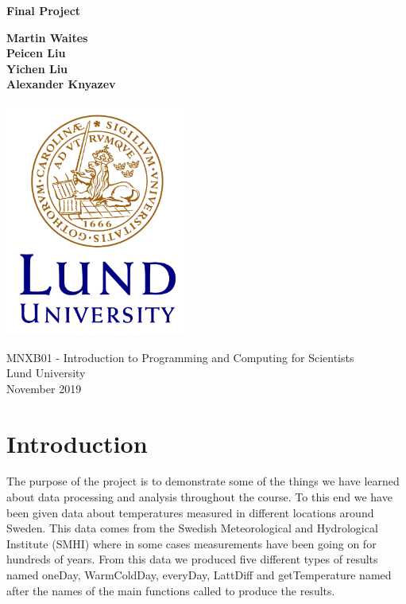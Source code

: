 \documentclass[a4paper,12pt]{article}
\begin{document}
\begin{titlepage}
    \begin{center}
        \vspace*{1cm}
        \Huge
        \textbf{Final Project}
        
        \Large
        \vspace{2.5cm}
        \textbf{Martin Waites\\ Peicen Liu\\ Yichen Liu\\ Alexander Knyazev}
        \vspace{3.5cm}
        \begin{center}
           \includegraphics[height=7.7cm]
           {LU_logo.png}
        \end{center}
        \vfill
        \vspace{0.8cm}
        \Large
        MNXB01 - Introduction to Programming and Computing for Scientists\\
        Lund University\\
        November 2019
    \end{center}
\end{titlepage}

\newpage


\section{Introduction}

The purpose of the project is to demonstrate some of the things we have learned about data processing and analysis throughout the course. To this end we have been given data about temperatures measured in different locations around Sweden. This data comes from the Swedish Meteorological and Hydrological Institute (SMHI) where in some cases measurements have been going on for hundreds of years. From this data we produced five different types of results named oneDay, WarmColdDay, everyDay, LattDiff and getTemperature named after the names of the main functions called to produce the results.\\\\
\end{document}
